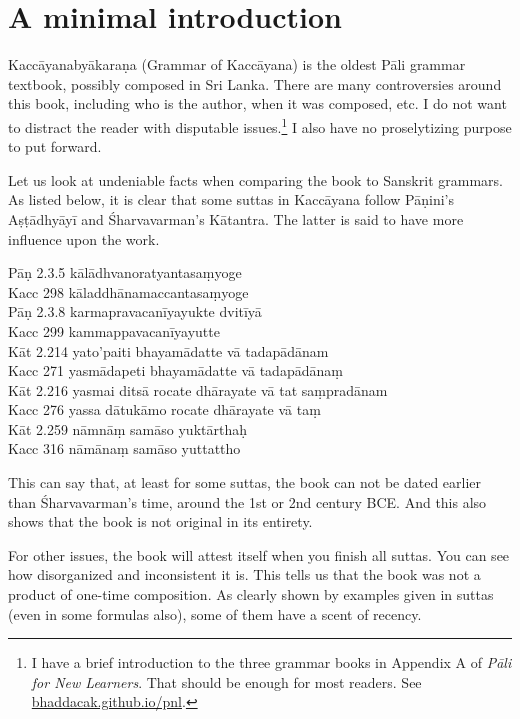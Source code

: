 \cleardoublepage
{}
{}
\chapter*{A minimal introduction}

Kaccāyanabyākaraṇa (Grammar of Kaccāyana) is the oldest Pāli grammar textbook, possibly composed in Sri Lanka. There are many controversies around this book, including who is the author, when it was composed, etc. I do not want to distract the reader with disputable issues.\footnote{I have a brief introduction to the three grammar books in Appendix A of \emph{Pāli for New Learners}. That should be enough for most readers. See \url{bhaddacak.github.io/pnl}.} I also have no proselytizing purpose to put forward.

Let us look at undeniable facts when comparing the book to Sanskrit grammars. As listed below, it is clear that some suttas in Kaccāyana follow Pāṇini's Aṣṭādhyāyī and Śharvavarman's Kātantra. The latter is said to have more influence upon the work.

\bigskip
{\small\noindent
Pāṇ 2.3.5 kālādhvanoratyantasaṃyoge\\
Kacc 298 kāladdhānamaccantasaṃyoge\\[1mm]
Pāṇ 2.3.8 karmapravacanīyayukte dvitīyā\\
Kacc 299 kammappavacanīyayutte\\[1mm]
Kāt 2.214 yato'paiti bhayamādatte vā tadapādānam\\
Kacc 271 yasmādapeti bhayamādatte vā tadapādānaṃ\\[1mm]
Kāt 2.216 yasmai ditsā rocate dhārayate vā tat saṃpradānam\\
Kacc 276 yassa dātukāmo rocate dhārayate vā taṃ\\[1mm]
Kāt 2.259 nāmnāṃ samāso yuktārthaḥ\\
Kacc 316 nāmānaṃ samāso yuttattho\\
}

This can say that, at least for some suttas, the book can not be dated earlier than Śharvavarman's time, around the 1st or 2nd century BCE. And this also shows that the book is not original in its entirety.

For other issues, the book will attest itself when you finish all suttas. You can see how disorganized and inconsistent it is. This tells us that the book was not a product of one-time composition. As clearly shown by examples given in suttas (even in some formulas also), some of them have a scent of recency.

